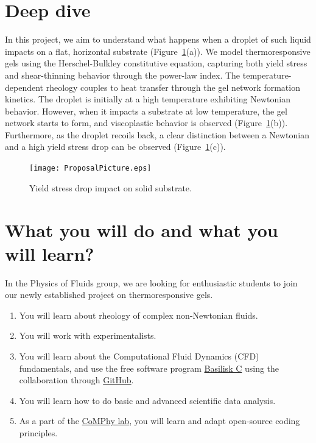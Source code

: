 \documentclass[11pt]{article}
\begin{document}
\section*{Deep dive}
In this project, we aim to understand what happens when a droplet of such liquid impacts on a flat, horizontal substrate (Figure~\ref{Fig::Fig1}(a)). We model thermoresponsive gels using the Herschel-Bulkley constitutive equation, capturing both yield stress and shear-thinning behavior through the power-law index. The temperature-dependent rheology couples to heat transfer through the gel network formation kinetics. The droplet is initially at a high temperature exhibiting Newtonian behavior. However, when it impacts a substrate at low temperature, the gel network starts to form, and viscoplastic behavior is observed (Figure~\ref{Fig::Fig1}(b)). Furthermore, as the droplet recoils back, a clear distinction between a Newtonian and a high yield stress drop can be observed (Figure~\ref{Fig::Fig1}(c)). 
\begin{figure}[H]
 \begin{center}
  \texttt{[image: ProposalPicture.eps]}
 \end{center}
 \caption{Yield stress drop impact on solid substrate.}
 \label{Fig::Fig1}
\end{figure}

\section*{What you will do and what you will learn?}
In the Physics of Fluids group, we are looking for enthusiastic students to join our newly established project on thermoresponsive gels. 

\begin{enumerate}
	\item You will learn about rheology of complex non-Newtonian fluids. 
	\item You will work with experimentalists.
	\item You will learn about the Computational Fluid Dynamics (CFD) fundamentals, and use the free software program \href{http://basilisk.fr}{Basilisk C} using the collaboration through \href{https://github.com/comphy-lab/VP-DropImpact}{GitHub}.
	\item You will learn how to do basic and advanced scientific data analysis. 
	\item As a part of the \href{https://comphy-lab.org}{CoMPhy lab}, you will learn and adapt open-source coding principles. 
\end{enumerate}
\end{document}

